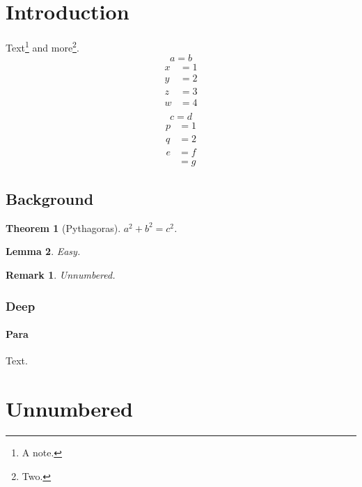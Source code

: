 \documentclass[11pt,a4paper]{article}
\newtheorem{thm}{Theorem}[section]
\newtheorem{lem}[thm]{Lemma}
\newtheorem*{rem}{Remark}
\begin{document}
\section{Introduction}\label{sec:intro}
Text\footnote{A note.\label{fn:one}} and more\footnote{Two.}.
\begin{equation}\label{eq:one}
  a = b
\end{equation}
\begin{align}
  x &= 1 \label{eq:x}\\
  y &= 2 \nonumber\\
  z &= 3 \tag{star}\label{eq:z}\\
  w &= 4 \label{eq:w}\\
\end{align}
\begin{equation*}
  c = d
\end{equation*}
\begin{subequations}\label{eq:sub}
\begin{align}
  p &= 1 \label{eq:p}\\
  q &= 2 \label{eq:q}
\end{align}
\end{subequations}
\begin{equation}
\begin{split}
  e &= f\\
    &= g
\end{split}\label{eq:split}
\end{equation}
\subsection{Background}\label{sec:bg}
\begin{thm}[Pythagoras]\label{thm:py}
  $a^2+b^2=c^2$.
\end{thm}
\begin{lem}\label{lem:a}
  Easy.
\end{lem}
\begin{rem}
  Unnumbered.
\end{rem}
\subsubsection{Deep}\label{sec:deep}
\paragraph{Para}\label{sec:para}
Text.
\section*{Unnumbered}
\end{document}
